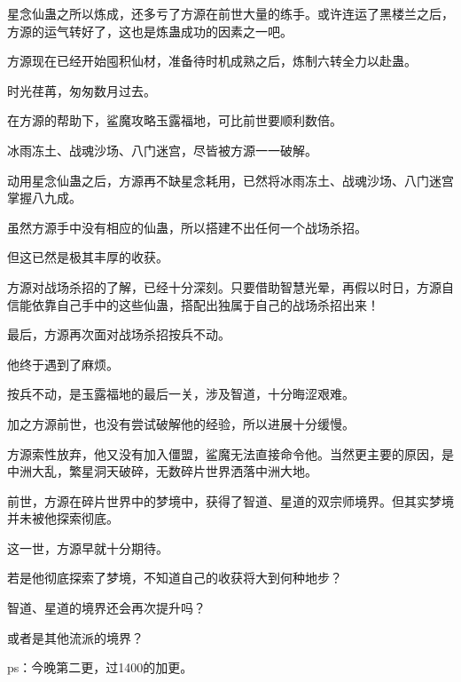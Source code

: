 \begin{this_body}
星念仙蛊之所以炼成，还多亏了方源在前世大量的练手。或许连运了黑楼兰之后，方源的运气转好了，这也是炼蛊成功的因素之一吧。

方源现在已经开始囤积仙材，准备待时机成熟之后，炼制六转全力以赴蛊。

时光荏苒，匆匆数月过去。

在方源的帮助下，鲨魔攻略玉露福地，可比前世要顺利数倍。

冰雨冻土、战魂沙场、八门迷宫，尽皆被方源一一破解。

动用星念仙蛊之后，方源再不缺星念耗用，已然将冰雨冻土、战魂沙场、八门迷宫掌握八九成。

虽然方源手中没有相应的仙蛊，所以搭建不出任何一个战场杀招。

但这已然是极其丰厚的收获。

方源对战场杀招的了解，已经十分深刻。只要借助智慧光晕，再假以时日，方源自信能依靠自己手中的这些仙蛊，搭配出独属于自己的战场杀招出来！

最后，方源再次面对战场杀招按兵不动。

他终于遇到了麻烦。

按兵不动，是玉露福地的最后一关，涉及智道，十分晦涩艰难。

加之方源前世，也没有尝试破解他的经验，所以进展十分缓慢。

方源索性放弃，他又没有加入僵盟，鲨魔无法直接命令他。当然更主要的原因，是中洲大乱，繁星洞天破碎，无数碎片世界洒落中洲大地。

前世，方源在碎片世界中的梦境中，获得了智道、星道的双宗师境界。但其实梦境并未被他探索彻底。

这一世，方源早就十分期待。

若是他彻底探索了梦境，不知道自己的收获将大到何种地步？

智道、星道的境界还会再次提升吗？

或者是其他流派的境界？

ps：今晚第二更，过1400的加更。

\end{this_body}

